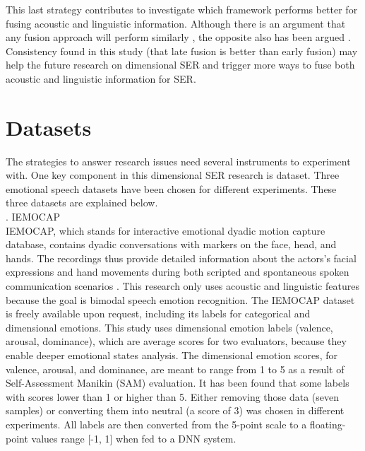 {This last strategy contributes to investigate which framework performs better
for fusing acoustic and linguistic information. Although there is an argument
that any fusion approach will perform similarly \cite{Pepino2020}, the opposite
also has been argued \cite{Planet2012}. Consistency found in this study (that
late fusion is better than early fusion) may help the future research on
dimensional SER and trigger more ways to fuse both acoustic and linguistic
information for SER.

\section{Datasets}
The strategies to answer research issues need several instruments to experiment
with. One key component in this dimensional SER research is dataset. Three
emotional speech datasets have been chosen for different experiments. These
three datasets are explained below. \\

. IEMOCAP \\
IEMOCAP, which stands for interactive emotional dyadic motion capture database,
contains dyadic conversations with markers on the face, head, and hands. The
recordings thus provide detailed information about the actors's facial
expressions and hand movements during both scripted and spontaneous spoken
communication scenarios \cite{Busso2008}. This research only uses acoustic and
linguistic features because the goal is bimodal speech emotion recognition. The
IEMOCAP dataset is freely available upon request, including its labels for
categorical and dimensional emotions. This study uses dimensional emotion labels
(valence, arousal, dominance), which are average scores for two evaluators,
because they enable deeper emotional states analysis. The dimensional emotion
scores, for valence, arousal, and dominance, are meant to range from 1 to 5 as
a result of Self-Assessment Manikin (SAM) evaluation. It has been found that
some labels with scores lower than 1 or higher than 5. Either removing those
data (seven samples) or converting them into neutral (a score of 3) was chosen
in different experiments.  All labels are then converted from the 5-point scale
to a floating-point values range [-1, 1] when fed to a DNN system.

}
